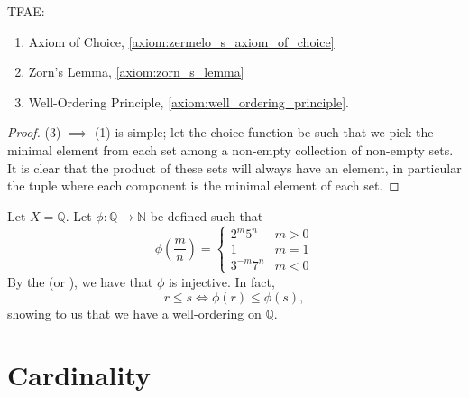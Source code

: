 \documentclass[notoc,notitlepage]{tufte-book}
\begin{document}
\begin{thm}\label{thm:axioms_of_choice_and_its_equivalents}
  TFAE:
  \begin{enumerate}
    \item Axiom of Choice, \cref{axiom:zermelo_s_axiom_of_choice}
    \item Zorn's Lemma, \cref{axiom:zorn_s_lemma}
    \item Well-Ordering Principle, \cref{axiom:well_ordering_principle}.
  \end{enumerate}
\end{thm}

\begin{proof}
  (3) $\implies$ (1) is simple; let the choice function be such that we pick the minimal element from each set among a non-empty collection of non-empty sets. It is clear that the product of these sets will always have an element, in particular the tuple where each component is the minimal element of each set.

\end{proof}

\begin{eg}
  Let $X = \mathbb{Q}$. Let $\phi: \mathbb{Q} \to \mathbb{N}$ be defined such that
  \begin{equation*}
    \phi\left(\frac{m}{n}\right) = \begin{cases}
      2^m 5^n    & m > 0 \\
      1          & m = 1 \\
      3^{-m} 7^n & m < 0
    \end{cases}
  \end{equation*}
  By the  (or ), we have that $\phi$ is injective. In fact,
  \begin{equation*}
    r \leq s \iff \phi(r) \leq \phi(s),
  \end{equation*}
  showing to us that we have a well-ordering on $\mathbb{Q}$.
\end{eg}


\section{Cardinality}%
\label{sec:cardinality}
\end{document}
